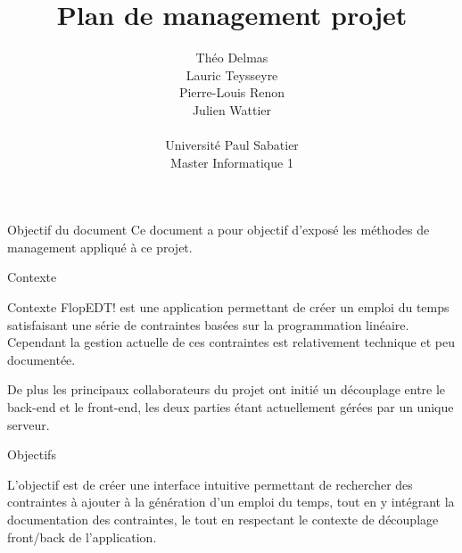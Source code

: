 \documentclass[]{article}
\title{Plan de management projet}
\author{
    Théo Delmas\\
    Lauric Teysseyre\\
    Pierre-Louis Renon\\
    Julien Wattier\\
    \\
    Université Paul Sabatier\\
    Master Informatique 1\\
   }
\date{}
\begin{document}
\maketitle
\newpage
\tableofcontents
\newpage

\begin{section}{Objectif du document}
 Ce document a pour objectif d'exposé les méthodes de management appliqué à ce projet.
\end{section}

\begin{section}{Contexte}
 \begin{subsection}{Contexte}
     FlopEDT! est une application permettant de créer un emploi du temps satisfaisant une série de contraintes basées sur
     la programmation linéaire. Cependant la gestion actuelle de ces contraintes est relativement technique et peu documentée.

     De plus les principaux collaborateurs du projet ont initié un découplage entre le back-end et le front-end, les deux parties étant actuellement gérées par un unique serveur.
 \end{subsection}

 \begin{subsection}{Objectifs}

     L’objectif est de créer une interface intuitive permettant de rechercher des contraintes à ajouter à la génération
     d’un emploi du temps, tout en y intégrant la documentation des contraintes, le tout en respectant le contexte de découplage front/back de l'application.
 \end{subsection}
\end{section}
\end{document}
